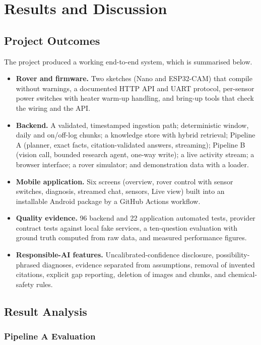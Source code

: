 \chapter{Results and Discussion}

\section{Project Outcomes}

The project produced a working end-to-end system, which is summarised below.

\begin{itemize}
\item \textbf{Rover and firmware.} Two sketches (Nano and ESP32-CAM) that compile without warnings, a documented HTTP API and UART
      protocol, per-sensor power switches with heater warm-up handling, and bring-up tools that check the wiring and the API.
\item \textbf{Backend.} A validated, timestamped ingestion path; deterministic window, daily and on/off-log chunks; a knowledge store with hybrid
      retrieval; Pipeline A (planner, exact facts, citation-validated answers, streaming); Pipeline B (vision call, bounded research agent,
      one-way write); a live activity stream; a browser interface; a rover simulator; and demonstration data with a loader.
\item \textbf{Mobile application.} Six screens (overview, rover control with sensor switches, diagnosis, streamed chat, sensors, Live view)
      built into an installable Android package by a GitHub Actions workflow.
\item \textbf{Quality evidence.} 96 backend and 22 application automated tests, provider contract tests against local fake services, a ten-question
      evaluation with ground truth computed from raw data, and measured performance figures.
\item \textbf{Responsible-AI features.} Uncalibrated-confidence disclosure, possibility-phrased diagnoses, evidence separated from assumptions,
      removal of invented citations, explicit gap reporting, deletion of images and chunks, and chemical-safety rules.
\end{itemize}

\section{Result Analysis}

\subsection{Pipeline A Evaluation}

